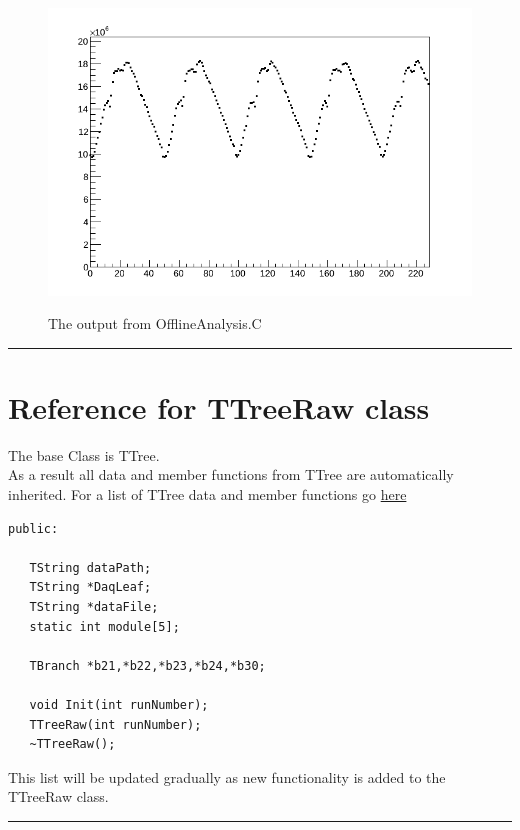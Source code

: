\documentclass[12pt]{article}
\begin{document}
\begin{figure}[htb]
\centering
\includegraphics[width=6in]{OfflineAnalysis.png}\\
\caption{The output from OfflineAnalysis.C}\label{f6}
\end{figure}

\noindent
{\color{red} \rule{\linewidth}{1mm} }
 
\newpage
\section{Reference for TTreeRaw class}
The base Class is  TTree.\\
As a result all data and member functions from TTree are automatically inherited. For a list of TTree data and member functions go \href{https://root.cern.ch/root/html/TTree.html}{here}
\begin{lstlisting}
public:

   TString dataPath;
   TString *DaqLeaf;
   TString *dataFile;
   static int module[5];

   TBranch *b21,*b22,*b23,*b24,*b30;

   void Init(int runNumber);
   TTreeRaw(int runNumber);
   ~TTreeRaw();

\end{lstlisting}
This list will be updated gradually as new functionality is added to the TTreeRaw class.

\noindent
{\color{red} \rule{\linewidth}{1mm} }
 
\end{document}
